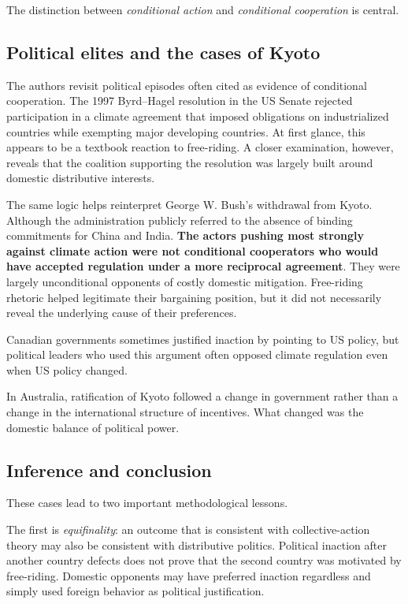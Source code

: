 The distinction between \textit{conditional action} and \textit{conditional cooperation} is central.

\subsection{Political elites and the cases of Kyoto}

The authors revisit political episodes often cited as evidence of conditional cooperation. The 1997 Byrd--Hagel resolution in the US Senate rejected participation in a climate agreement that imposed obligations on industrialized countries while exempting major developing countries. At first glance, this appears to be a textbook reaction to free-riding. A closer examination, however, reveals that the coalition supporting the resolution was largely built around domestic distributive interests.

The same logic helps reinterpret George W. Bush's withdrawal from Kyoto. Although the administration publicly referred to the absence of binding commitments for China and India. \textbf{The actors pushing most strongly against climate action were not conditional cooperators who would have accepted regulation under a more reciprocal agreement}. They were largely unconditional opponents of costly domestic mitigation. Free-riding rhetoric helped legitimate their bargaining position, but it did not necessarily reveal the underlying cause of their preferences.

Canadian governments sometimes justified inaction by pointing to US policy, but political leaders who used this argument often opposed climate regulation even when US policy changed.

In Australia, ratification of Kyoto followed a change in government rather than a change in the international structure of incentives. What changed was the domestic balance of political power.

\subsection{Inference and conclusion}

These cases lead to two important methodological lessons.

The first is \textit{equifinality}: an outcome that is consistent with collective-action theory may also be consistent with distributive politics. Political inaction after another country defects does not prove that the second country was motivated by free-riding. Domestic opponents may have preferred inaction regardless and simply used foreign behavior as political justification.

